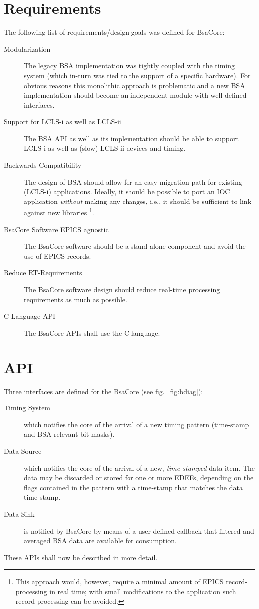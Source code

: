 \documentclass[11pt]{article}
\newcommand{\bsac}{BsaCore}
\newcommand{\bsa} {BSA}
\newcommand{\EDEF}{EDEF}
\begin{document}
\section{Requirements}
The following list of requirements/design-goals was defined for \bsac:
\begin{description}
\item[Modularization] The legacy \bsa{} implementation was tightly coupled with the timing
   system (which in-turn was tied to the support of a specific hardware). For obvious reasons
   this monolithic approach is problematic and a new \bsa{} implementation should become an
   independent module with well-defined interfaces.
\item[Support for LCLS-i as well as LCLS-ii] The \bsa{} API as well as its implementation should
   be able to support LCLS-i as well as (slow) LCLS-ii devices and timing.
\item[Backwards Compatibility] The design of \bsa{} should allow for an easy migration path for
   existing (LCLS-i) applications. Ideally, it should be possible to port an IOC application
   {\em without} making any changes, i.e., it should be sufficient to link against new libraries%
\footnote{This approach would, however, require a minimal amount of EPICS record-processing in real
time; with small modifications to the application such record-processing can be avoided.}.
\item[\bsac{} Software EPICS agnostic] The \bsac{} software should be a stand-alone component and
   avoid the use of EPICS records.
\item[Reduce RT-Requirements] The \bsac{} software design should reduce real-time processing
   requirements as much as possible.
\item[C-Language API] The \bsac{} APIs shall use the C-language.
\end{description}

\section{API}
Three interfaces are defined for the \bsac{} (see fig.~\ref{fig:bdiag}):
\begin{description}
\item[Timing System] which notifies the core of the arrival of a new timing pattern (time-stamp and
     \bsa{}-relevant bit-masks).
\item[Data Source] which notifies the core of the arrival of a new, {\em time-stamped} data item.
     The data may be discarded or stored for one or more \EDEF{}s, depending on the flags contained
     in the pattern with a time-stamp that matches the data time-stamp.
\item[Data Sink] is notified by \bsac{} by means of a user-defined callback that filtered and averaged
     \bsa{} data are available for consumption.
\end{description}
These APIs shall now be described in more detail.
\end{document}
